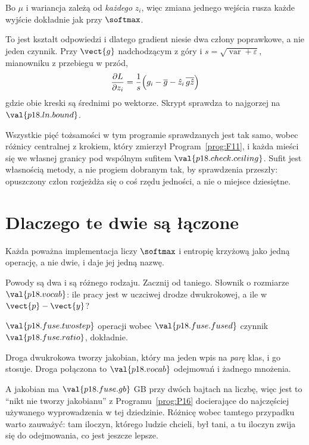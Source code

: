 \begin{fr}
\begin{ansblock}
Bo $\mu$ i wariancja zależą od \emph{każdego} $z_i$, więc zmiana jednego
wejścia rusza każde wyjście \dash{} dokładnie jak przy $\softmax$.
\end{ansblock}

To jest kształt odpowiedzi i dlatego gradient niesie dwa człony poprawkowe, a
nie jeden czynnik. Przy $\vect{g}$ nadchodzącym z góry i
$s = \sqrt{\operatorname{var} + \varepsilon}$, mianowniku z przebiegu w
przód,
\[ \frac{\partial L}{\partial z_i} = \frac{1}{s}\Bigl(g_i
   - \overline{g} - \hat{z}_i\,\overline{g\hat{z}}\Bigr) \]
gdzie obie kreski są średnimi po wektorze. Skrypt sprawdza to najgorzej na
$\val{p18.ln.bound}$.

\begin{note}
Wszystkie pięć tożsamości w tym programie sprawdzanych jest tak samo, wobec
różnicy centralnej z krokiem, który zmierzył Program~\ref{prog:F11}, i każda
mieści się we własnej granicy pod wspólnym sufitem
$\val{p18.check.ceiling}$. Sufit jest własnością metody, a nie progiem
dobranym tak, by sprawdzenia przeszły: opuszczony człon rozjeżdża się o coś
rzędu jedności, a nie o miejsce dziesiętne.
\end{note}
\end{fr}

\section{Dlaczego te dwie są łączone}
\label{sec:P18-fusion}

\begin{fr}
Każda poważna implementacja liczy $\softmax$ i entropię krzyżową jako jedną
operację, a nie dwie, i daje jej jedną nazwę.

Powody są dwa i są różnego rodzaju. Zacznij od taniego. Słownik o rozmiarze
$\val{p18.vocab}$: ile pracy jest w uczciwej drodze dwukrokowej, a ile w
$\vect{p} - \vect{y}$?
\dotline
\nextframe
\end{fr}

\begin{fr}
\begin{ansblock}
$\val{p18.fuse.twostep}$ operacji wobec $\val{p18.fuse.fused}$
\dash{} czynnik $\val{p18.fuse.ratio}$, dokładnie.
\end{ansblock}

Droga dwukrokowa tworzy jakobian, który ma jeden wpis na \emph{parę} klas, i
go stosuje. Droga połączona to $\val{p18.vocab}$ odejmowań i żadnego
mnożenia.

A jakobian ma $\val{p18.fuse.gb}$ GB przy dwóch bajtach na liczbę, więc
jest to \enquote{nikt nie tworzy jakobianu} z Programu~\ref{prog:P16}
docierające do najczęściej używanego wyprowadzenia w tej dziedzinie. Różnicę
wobec tamtego przypadku warto zauważyć: tam iloczyn, którego ludzie chcieli,
był tani, a tu iloczyn zwija się do odejmowania, co jest jeszcze lepsze.

\end{fr}

